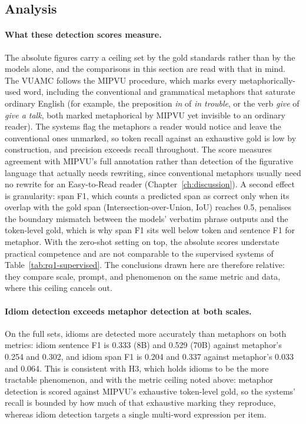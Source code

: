 \subsection{Analysis}

\paragraph{What these detection scores measure.} The absolute figures carry a ceiling set by the gold standards rather than by the models alone, and the comparisons in this section are read with that in mind. The VUAMC follows the MIPVU procedure, which marks every metaphorically-used word, including the conventional and grammatical metaphors that saturate ordinary English (for example, the preposition \textit{in} of \textit{in trouble}, or the verb \textit{give} of \textit{give a talk}, both marked metaphorical by MIPVU yet invisible to an ordinary reader). The systems flag the metaphors a reader would notice and leave the conventional ones unmarked, so token recall against an exhaustive gold is low by construction, and precision exceeds recall throughout. The score measures agreement with MIPVU's full annotation rather than detection of the figurative language that actually needs rewriting, since conventional metaphors usually need no rewrite for an Easy-to-Read reader (Chapter~\ref{ch:discussion}). A second effect is granularity: span F1, which counts a predicted span as correct only when its overlap with the gold span (Intersection-over-Union, IoU) reaches 0.5, penalises the boundary mismatch between the models' verbatim phrase outputs and the token-level gold, which is why span F1 sits well below token and sentence F1 for metaphor. With the zero-shot setting on top, the absolute scores understate practical competence and are not comparable to the supervised systems of Table~\ref{tab:rq1-supervised}. The conclusions drawn here are therefore relative: they compare scale, prompt, and phenomenon on the same metric and data, where this ceiling cancels out.

\paragraph{Idiom detection exceeds metaphor detection at both scales.} On the full sets, idioms are detected more accurately than metaphors on both metrics: idiom sentence F1 is 0.333 (8B) and 0.529 (70B) against metaphor's 0.254 and 0.302, and idiom span F1 is 0.204 and 0.337 against metaphor's 0.033 and 0.064. This is consistent with H3, which holds idioms to be the more tractable phenomenon, and with the metric ceiling noted above: metaphor detection is scored against MIPVU's exhaustive token-level gold, so the systems' recall is bounded by how much of that exhaustive marking they reproduce, whereas idiom detection targets a single multi-word expression per item.

